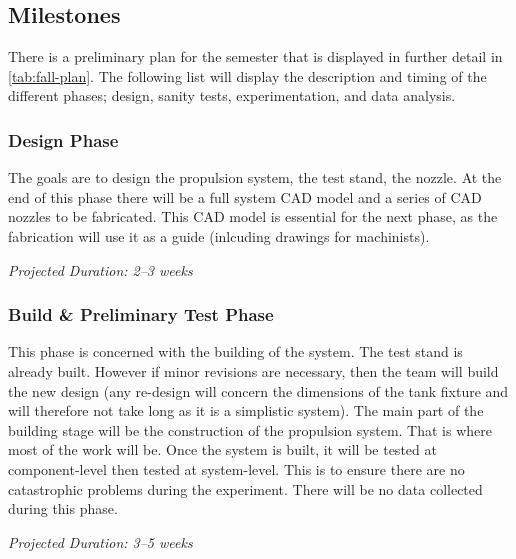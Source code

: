 \documentclass[conference]{IEEEtran} %
\begin{document}
\subsection{Milestones}
\label{subsec:milestones}

There is a preliminary plan for the semester that is displayed in further detail in \autoref{tab:fall-plan}. The following list will display the description and timing
of the different phases; design, sanity tests, experimentation, and data analysis.

\subsubsection{Design Phase}
\label{subsubsec: design phase}
    The goals are to design the propulsion system, the test stand, the nozzle. At the end of this phase
    there will be a full system CAD model and a series of CAD nozzles to be fabricated. This CAD model is essential for the next phase, as the fabrication
    will use it as a guide (inlcuding drawings for machinists).

    \textit{Projected Duration: 2--3 weeks}

\subsubsection{Build \& Preliminary Test Phase}
\label{subsubsec: sanity test phase}
    This phase is concerned with the building of the system. The test stand is already built. However if minor revisions are necessary, then the team will
    build the new design (any re-design will concern the dimensions of the tank fixture and will therefore not take long as it is a simplistic system).
    The main part of the building stage will be the construction of the propulsion system. That is where most of the work will be. Once the system is built,
    it will be tested at component-level then tested at system-level. This is to ensure there are no catastrophic problems during the experiment.
    There will be no data collected during this phase.

    \textit{Projected Duration: 3--5 weeks}
\end{document}
